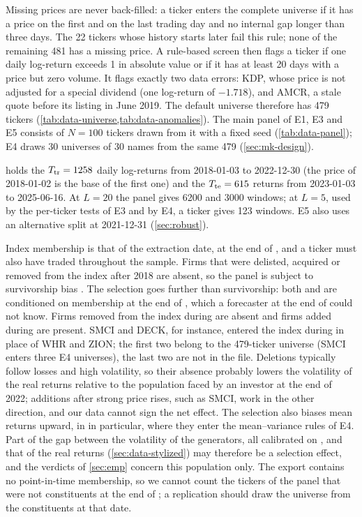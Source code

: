 Missing prices are never back-filled:
a ticker enters the complete universe if it has a price on the first and on the last trading day
and no internal gap longer than three days. The 22 tickers whose history starts later fail this
rule; none of the remaining 481 has a missing price. A rule-based screen then flags a ticker if
one daily log-return exceeds 1 in absolute value or if it has at least 20 days with a price but
zero volume. It flags exactly two data errors: KDP, whose price is not adjusted for a special
dividend (one log-return of $-1.718$), and AMCR, a stale quote before its listing in June 2019.
The default universe therefore has 479 tickers (\cref{tab:data-universe,tab:data-anomalies}).
The main panel of E1, E3 and E5 consists of $N=100$ tickers drawn from it with a fixed seed
(\cref{tab:data-panel}); E4 draws 30 universes of 30 names from the same 479
(\cref{sec:mk-design}).

\TRAIN{} holds the $T_{\mathrm{tr}}=1258$ daily log-returns from 2018-01-03 to 2022-12-30 (the price of
2018-01-02 is the base of the first one) and \TEST{} the $T_{\mathrm{te}}=615$ returns from 2023-01-03 to
2025-06-16. At $L=20$ the panel gives 6200 \TRAIN{} and 3000 \TEST{} windows; at $L=5$, used by
the per-ticker tests of E3 and by E4, a ticker gives 123 \TEST{} windows. E5 also uses an
alternative split at 2021-12-31 (\cref{sec:robust}).

Index membership is that of the extraction date, at the end of \TEST{}, and a ticker must also
have traded throughout the sample. Firms that were delisted, acquired or removed from the index
after 2018 are absent, so the panel is subject to survivorship bias
\citep{brown1992survivorship,shumway1997delisting}. The selection goes further than survivorship:
both \TRAIN{} and \TEST{} are conditioned on membership at the end of \TEST{}, which a forecaster
at the end of \TRAIN{} could not know. Firms removed from the index during \TEST{} are absent and
firms added during \TEST{} are present. SMCI and DECK, for instance, entered the index during
\TEST{} in place of WHR and ZION; the first two belong to the 479-ticker universe (SMCI enters
three E4 universes), the last two are not in the file. Deletions typically follow losses
and high volatility, so their absence probably lowers the volatility of the real \TEST{} returns
relative to the population faced by an investor at the end of 2022; additions after strong price
rises, such as SMCI, work in the other direction, and our data cannot sign the net effect. The
selection also biases mean returns upward, in \TRAIN{} in particular, where they enter the
mean--variance rules of E4. Part of the gap between the volatility of the generators, all
calibrated on \TRAIN{}, and that of the real \TEST{} returns (\cref{sec:data-stylized}) may
therefore be a selection effect, and the verdicts of \cref{sec:emp} concern this population only.
The export contains no point-in-time membership, so we cannot count the tickers of the panel that
were not constituents at the end of \TRAIN{}; a replication should draw the universe from the
constituents at that date.

